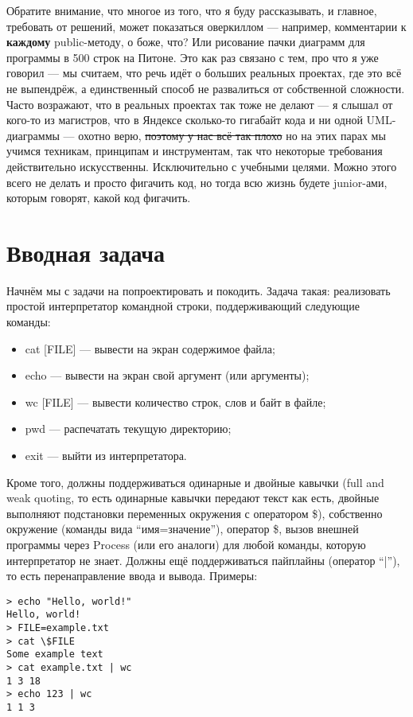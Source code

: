 \documentclass[a5paper]{article}
\begin{document}
Обратите внимание, что многое из того, что я буду рассказывать, и главное, требовать от решений, может показаться оверкиллом --- например, комментарии к \textbf{каждому} public-методу, о боже, что? Или рисование пачки диаграмм для программы в 500 строк на Питоне. Это как раз связано с тем, про что я уже говорил --- мы считаем, что речь идёт о больших реальных проектах, где это всё не выпендрёж, а единственный способ не развалиться от собственной сложности. Часто возражают, что в реальных проектах так тоже не делают --- я слышал от кого-то из магистров, что в Яндексе сколько-то гигабайт кода и ни одной UML-диаграммы --- охотно верю, \sout{поэтому у нас всё так плохо} но на этих парах мы учимся техникам, принципам и инструментам, так что некоторые требования действительно искусственны. Исключительно с учебными целями. Можно этого всего не делать и просто фигачить код, но тогда всю жизнь будете junior-ами, которым говорят, какой код фигачить.

\section{Вводная задача}
Начнём мы с задачи на попроектировать и покодить. Задача такая: реализовать простой интерпретатор командной строки, поддерживающий следующие команды:
\begin{itemize}
	\item cat [FILE] --- вывести на экран содержимое файла;
	\item echo --- вывести на экран свой аргумент (или аргументы);
	\item wc [FILE] --- вывести количество строк, слов и байт в файле;
	\item pwd --- распечатать текущую директорию;
	\item exit --- выйти из интерпретатора.
\end{itemize}
Кроме того, должны поддерживаться одинарные и двойные кавычки (full and weak quoting, то есть одинарные кавычки передают текст как есть, двойные выполняют подстановки переменных окружения с оператором \$), собственно окружение (команды вида ``имя=значение''), оператор \$, вызов внешней программы через Process (или его аналоги) для любой команды, которую интерпретатор не знает. Должны ещё поддерживаться пайплайны (оператор ``|''), то есть перенаправление ввода и вывода. Примеры:
\begin{verbatim}
> echo "Hello, world!"
Hello, world!
> FILE=example.txt
> cat \$FILE
Some example text
> cat example.txt | wc
1 3 18
> echo 123 | wc
1 1 3
\end{verbatim}
\end{document}
